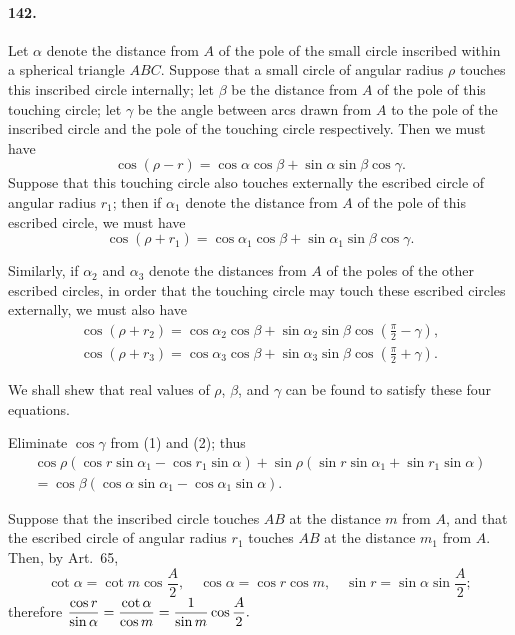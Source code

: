 \documentclass{book}[2004/02/16]
\begin{document}
\begin{mainmatter}
\begin{spacing}{1.3}
\paragraph{142.} Let $\alpha$ denote the distance from $A$ of the pole of the
small circle inscribed within a spherical triangle $ABC$. Suppose
that a small circle of angular radius $\rho$ touches this inscribed circle
internally; let $\beta$ be the distance from $A$ of the pole of this touching
circle; let $\gamma$ be the angle between arcs drawn from $A$ to the
pole of the inscribed circle and the pole of the touching circle
respectively. Then we must have
\[
\cos(\rho-r) = \cos\alpha\cos\beta + \sin\alpha\sin\beta\cos\gamma. \tag{1}
\]
Suppose that this touching circle also touches externally the
escribed circle of angular radius $r_1$; then if $\alpha_1$ denote the distance
from $A$ of the pole of this escribed circle, we must have
\[
\cos(\rho+r_1) = \cos\alpha_1\cos\beta + \sin\alpha_1\sin\beta\cos\gamma. \tag{2}
\]

Similarly, if $\alpha_2$ and $\alpha_3$ denote the distances from $A$ of the poles
of the other escribed circles, in order that the touching circle may
touch these escribed circles externally, we must also have
\begin{gather*}
\cos(\rho+r_2) = \cos\alpha_2\cos\beta + \sin\alpha_2\sin\beta \cos\left(\frac{\pi}{2}-\gamma\right), \tag{3}\\[1.5ex]
\cos(\rho+r_3) = \cos\alpha_3\cos\beta + \sin\alpha_3\sin\beta \cos\left(\frac{\pi}{2}+\gamma\right). \tag{4}
\end{gather*}

We shall shew that real values of $\rho$, $\beta$, and $\gamma$ can be found to
satisfy these four equations.

Eliminate $\cos \gamma$ from (1) and (2); thus
\begin{multline*}
\cos\rho(\cos r\sin\alpha_1-\cos r_1\sin\alpha) +
\sin\rho(\sin r\sin\alpha_1+\sin r_1\sin\alpha) \\
= \cos\beta (\cos\alpha \sin\alpha_1 - \cos\alpha_1 \sin\alpha). \tag{5}
\end{multline*}

Suppose that the inscribed circle touches $AB$ at the distance $m$
from $A$, and that the escribed circle of angular radius $r_1$ touches
$AB$ at the distance $m_1$ from $A$. Then, by Art.~65,
\[
  \cot \alpha = \cot m \cos \frac{A}{2}, \quad
  \cos \alpha = \cos r\cos m, \quad
  \sin r = \sin \alpha \sin\frac{A}{2};
\]
therefore $\hfill\displaystyle
  \frac{\cos r}{\sin \alpha}
= \frac{\cot \alpha}{\cos m} =
\frac{1}{\sin m}\cos\frac{A}{2}.
\hfill\phantom{therefore }$\\


\end{spacing}
\end{mainmatter}
\end{document}
